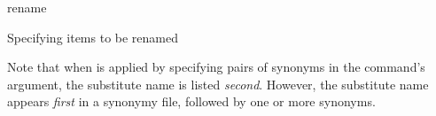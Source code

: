 \begin{command}{rename}{}
\begin{arguments}
\begin{argumentgroup}{Specifying items to be renamed}
                \begin{statement}
                Note that when  is applied by specifying pairs of
                 synonyms in the command's argument,
                the substitute name is listed \emph{second}. However,  the substitute name 
                appears \emph{first} in a synonymy file, followed by one or more synonyms.
                \end{statement}
	      \end{argumentgroup}
	      
          \end{arguments}
          
          \begin{poyexamples}
          
            
            
    \end{poyexamples}

\end{command}

           

